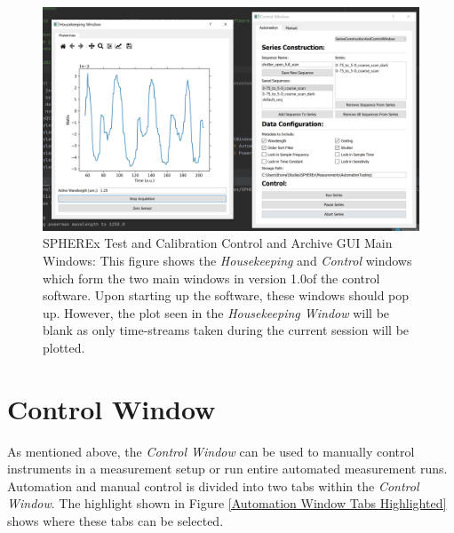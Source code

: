 \documentclass{article}
\newcommand{\version}{1.0}
\begin{document}
\begin{figure}[H]
\label{Main GUI}
\includegraphics[width=\textwidth]{./images/MainGUIViews.png}
\caption{SPHEREx Test and Calibration Control and Archive GUI Main Windows: This figure shows the \emph{Housekeeping} and \emph{Control} windows which form the two main windows in version \version of the control software. Upon starting up the software, these windows should pop up. However, the plot seen in the \emph{Housekeeping Window} will be blank as only time-streams taken during the current session will be plotted.}	
\end{figure}

\section{Control Window}

As mentioned above, the \emph{Control Window} can be used to manually control instruments in a measurement setup or run entire automated measurement runs. Automation and manual control is divided into two tabs within the \emph{Control Window}. The highlight shown in Figure \ref{Automation Window Tabs Highlighted} shows where these tabs can be selected.   
\end{document}
